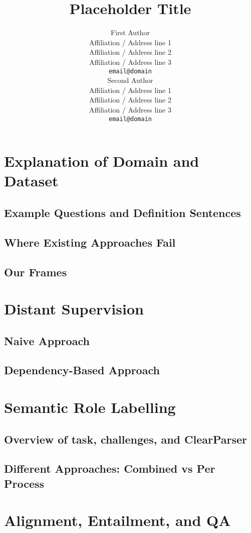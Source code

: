 \documentclass[11pt,a4paper]{article}
\title{Placeholder Title}
\author{First Author \\
  Affiliation / Address line 1 \\
  Affiliation / Address line 2 \\
  Affiliation / Address line 3 \\
  {\tt email@domain} \\\And
  Second Author \\
  Affiliation / Address line 1 \\
  Affiliation / Address line 2 \\
  Affiliation / Address line 3 \\
  {\tt email@domain} \\}
\date{}
\begin{document}
\maketitle




\section{Explanation of Domain and Dataset}
	\subsection{Example Questions and Definition Sentences}
	\subsection{Where Existing Approaches Fail}
	\subsection{Our Frames}

\section{Distant Supervision}
	\subsection{Naive Approach}
	\subsection{Dependency-Based Approach}

\section{Semantic Role Labelling}
	\subsection{Overview of task, challenges, and ClearParser}
	\subsection{Different Approaches: Combined vs Per Process}

\section{Alignment, Entailment, and QA}
\end{document}
